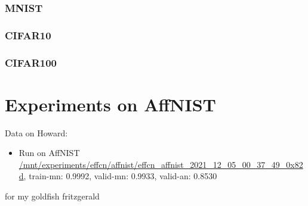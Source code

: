 \documentclass{article}
\begin{document}
\subsubsection{MNIST}
\subsubsection{CIFAR10}
\subsubsection{CIFAR100}


\section{Experiments on AffNIST}

Data on Howard:
\begin{itemize}
	\item Run on AffNIST \url{/mnt/experiments/effcn/affnist/effcn_affnist_2021_12_05_00_37_49_0x82d}, train-mn: 0.9992, valid-mn: 0.9933, valid-an: 0.8530
\end{itemize}

\begin{ack}
for my goldfish fritzgerald
\end{ack}



\end{document}
